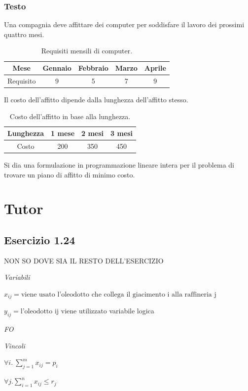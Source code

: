 \subsubsection{Testo}
Una compagnia deve affittare dei computer per soddisfare il lavoro dei prossimi quattro mesi.

\begin{table}[h!]
\centering
\begin{tabular}{|c|c|c|c|c|}
\hline
Mese & Gennaio & Febbraio & Marzo & Aprile \\
\hline
Requisito & 9 & 5 & 7 & 9 \\
\hline
\end{tabular}
\caption{Requisiti mensili di computer.}
\end{table}

Il costo dell'affitto dipende dalla lunghezza dell'affitto stesso.

\begin{table}[h!]
\centering
\begin{tabular}{|c|c|c|c|}
\hline
Lunghezza & 1 mese & 2 mesi & 3 mesi \\
\hline
Costo & 200 & 350 & 450 \\
\hline
\end{tabular}
\caption{Costo dell'affitto in base alla lunghezza.}
\end{table}

Si dia una formulazione in programmazione lineare intera per il problema di trovare un piano di affitto di minimo costo.
\section{Tutor}

\subsection{Esercizio 1.24}

NON SO DOVE SIA IL RESTO DELL'ESERCIZIO

\textit{Variabili}

$ x_{ij} = \text{viene usato l'oleodotto che collega il giacimento i alla raffineria j} $

$ y_{ij} = \text{l'oleodotto ij viene utilizzato} $ variabile logica

\textit{FO}

\textit{Vincoli}

$ \forall i.\ \sum_{j = 1}^{m} x_{ij} = p_i $

$ \forall j. \sum_{i=1}^{n} x_{ij} \leq r_j $

